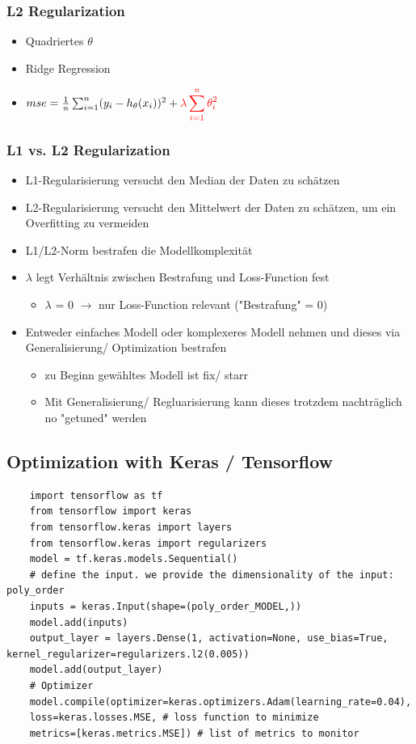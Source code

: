 \subsubsection{L2 Regularization}
\begin{itemize}
    \item Quadriertes $\theta$
    \item Ridge Regression
    \item $mse = \frac{1}{n}\sum_{i=1}^{n} (y_i - h_{\theta}(x_i))^2+\textcolor{red}{\lambda \displaystyle\sum_{i=1}^n\theta_i^2}$
\end{itemize}

\subsubsection{L1 vs. L2 Regularization}
\begin{itemize}
    \item L1-Regularisierung versucht den Median der Daten zu schätzen
    \item L2-Regularisierung versucht den Mittelwert der Daten zu schätzen, um ein Overfitting zu vermeiden
    \item L1/L2-Norm bestrafen die Modellkomplexität
    \item $\lambda$ legt Verhältnis zwischen Bestrafung und Loss-Function fest
    \begin{itemize}
        \item $\lambda$ = 0 $\rightarrow$ nur Loss-Function relevant ("Bestrafung" = 0)
    \end{itemize}
    \item Entweder einfaches Modell oder komplexeres Modell nehmen und dieses via Generalisierung/ Optimization bestrafen
    \begin{itemize}
        \item zu Beginn gewähltes Modell ist fix/ starr
        \item Mit Generalisierung/ Regluarisierung kann dieses trotzdem nachträglich no "getuned" werden
    \end{itemize}

\end{itemize}


\subsection{Optimization with Keras / Tensorflow}
\begin{verbatim}
    import tensorflow as tf
    from tensorflow import keras
    from tensorflow.keras import layers
    from tensorflow.keras import regularizers
    model = tf.keras.models.Sequential()
    # define the input. we provide the dimensionality of the input: poly_order
    inputs = keras.Input(shape=(poly_order_MODEL,))
    model.add(inputs)
    output_layer = layers.Dense(1, activation=None, use_bias=True, kernel_regularizer=regularizers.l2(0.005))
    model.add(output_layer)
    # Optimizer
    model.compile(optimizer=keras.optimizers.Adam(learning_rate=0.04),
    loss=keras.losses.MSE, # loss function to minimize
    metrics=[keras.metrics.MSE]) # list of metrics to monitor
\end{verbatim}

